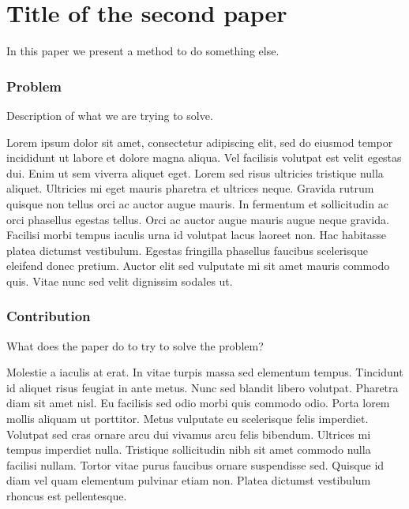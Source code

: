 \clearpage

\section{Title of the second paper}

In this paper we present a method to do something else.


\subsubsection*{Problem}

Description of what we are trying to solve.

\vskip 1cm

Lorem ipsum dolor sit amet, consectetur adipiscing elit, sed do eiusmod tempor incididunt ut labore et dolore magna aliqua. Vel facilisis volutpat est velit egestas dui. Enim ut sem viverra aliquet eget. Lorem sed risus ultricies tristique nulla aliquet. Ultricies mi eget mauris pharetra et ultrices neque. Gravida rutrum quisque non tellus orci ac auctor augue mauris. In fermentum et sollicitudin ac orci phasellus egestas tellus. Orci ac auctor augue mauris augue neque gravida. Facilisi morbi tempus iaculis urna id volutpat lacus laoreet non. Hac habitasse platea dictumst vestibulum. Egestas fringilla phasellus faucibus scelerisque eleifend donec pretium. Auctor elit sed vulputate mi sit amet mauris commodo quis. Vitae nunc sed velit dignissim sodales ut.



\subsubsection*{Contribution}

What does the paper do to try to solve the problem?

\vskip 1cm

Molestie a iaculis at erat. In vitae turpis massa sed elementum tempus. Tincidunt id aliquet risus feugiat in ante metus. Nunc sed blandit libero volutpat. Pharetra diam sit amet nisl. Eu facilisis sed odio morbi quis commodo odio. Porta lorem mollis aliquam ut porttitor. Metus vulputate eu scelerisque felis imperdiet. Volutpat sed cras ornare arcu dui vivamus arcu felis bibendum. Ultrices mi tempus imperdiet nulla. Tristique sollicitudin nibh sit amet commodo nulla facilisi nullam. Tortor vitae purus faucibus ornare suspendisse sed. Quisque id diam vel quam elementum pulvinar etiam non. Platea dictumst vestibulum rhoncus est pellentesque.



